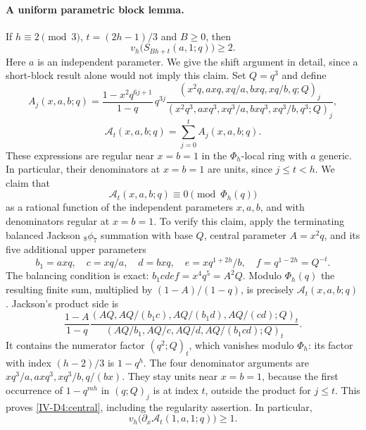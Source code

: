 \documentclass[11pt,letterpaper]{article}
\numberwithin{equation}{section}
\begin{document}
\paragraph{A uniform parametric block lemma.}
If $h\equiv2\pmod3$, $t=(2h-1)/3$ and $B\ge0$, then
\begin{equation}\label{IV-D4:block2}
 v_h\bigl(S_{Bh+t}(a,1;q)\bigr)\ge2.
\end{equation}
Here $a$ is an independent parameter.  We give the shift argument in
detail, since a short-block result alone would not imply this claim.
Set $Q=q^3$ and define
\[
 A_j(x,a,b;q)=\frac{1-x^2q^{6j+1}}{1-q}\,q^{3j}
 \frac{(x^2q,axq,xq/a,bxq,xq/b,q;Q)_j}
 {(x^2q^3,axq^3,xq^3/a,bxq^3,xq^3/b,q^3;Q)_j},
\]
\[
 \mathcal A_t(x,a,b;q)=\sum_{j=0}^t A_j(x,a,b;q).
\]
These expressions are regular near $x=b=1$ in the $\Phi_h$-local
ring with $a$ generic.  In particular, their denominators at
$x=b=1$ are units, since $j\le t<h$.
We claim that
\begin{equation}\label{IV-D4:central}
 \mathcal A_t(x,a,b;q)\equiv0\pmod{\Phi_h(q)}
\end{equation}
as a rational function of the independent parameters $x,a,b$,
and with denominators regular at $x=b=1$.
To verify this claim, apply the terminating balanced Jackson
${}_8\phi_7$ summation with base $Q$, central parameter $A=x^2q$,
and its five additional upper parameters
\[
 b_1=axq,\quad c=xq/a,\quad d=bxq,\quad
 e=xq^{1+2h}/b,\quad f=q^{1-2h}=Q^{-t}.
\]
The balancing condition is exact:
$b_1cdef=x^4q^5=A^2Q$.  Modulo $\Phi_h(q)$ the resulting
finite sum, multiplied by $(1-A)/(1-q)$, is precisely
$\mathcal A_t(x,a,b;q)$.  Jackson's product side is
\[
 \frac{1-A}{1-q}
 \frac{(AQ,AQ/(b_1c),AQ/(b_1d),AQ/(cd);Q)_t}
 {(AQ/b_1,AQ/c,AQ/d,AQ/(b_1cd);Q)_t}.
\]
It contains the numerator factor $(q^2;Q)_t$, which vanishes
modulo $\Phi_h$: its factor with index $(h-2)/3$ is $1-q^h$.
The four denominator arguments are $xq^3/a,axq^3,xq^3/b,q/(bx)$.
They stay units near $x=b=1$, because the first occurrence of
$1-q^{mh}$ in $(q;Q)_j$ is at index $t$, outside the product
for $j\le t$.  This proves \eqref{IV-D4:central}, including the
regularity assertion.  In particular,
\begin{equation}\label{IV-D4:derivative}
 v_h\bigl(\partial_x \mathcal A_t(1,a,1;q)\bigr)\ge1.
\end{equation}
\end{document}
